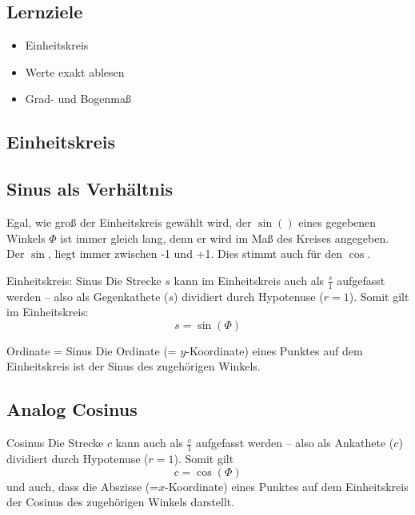 \subsection*{Lernziele}

\begin{itemize}
\item Einheitskreis
\item Werte exakt ablesen
\item Grad- und Bogenmaß
\end{itemize}

\newpage
\subsection{Einheitskreis}

\TRAINER{\einheitskreis{}}




\subsection{Sinus als Verhältnis}
Egal, wie groß der Einheitskreis gewählt wird, der $\sin()$ eines
gegebenen Winkels $\Phi$ ist immer gleich lang, denn er wird im Maß
des Kreises angegeben. Der $\sin{}$, liegt immer zwischen -1 und
+1. Dies stimmt auch für den $\cos{}$.

\begin{gesetz}{Einheitskreis: Sinus}{}
  Die Strecke $s$ kann im Einheitskreis auch als $\frac{s}1$ aufgefasst werden -- also
  als Gegenkathete ($s$) dividiert durch Hypotenuse ($r=1$). Somit
  gilt im Einheitskreis:
  $$s = \sin(\Phi)$$
\end{gesetz}

\begin{bemerkung}{Ordinate = Sinus}{}
  Die Ordinate (= $y$-Koordinate) eines Punktes auf dem Einheitskreis ist
  der Sinus des zugehörigen Winkels.
\end{bemerkung}
\newpage

\subsection{Analog Cosinus}
\begin{bemerkung}{Cosinus}{}
  Die Strecke $c$ kann auch als $\frac{c}1$ aufgefasst werden -- also
  als Ankathete ($c$) dividiert durch Hypotenuse ($r=1$). Somit
  gilt
  $$c = \cos(\Phi)$$
  und auch, dass die Abszisse (=$x$-Koordinate) eines Punktes auf dem
  Einheitskreis der Cosinus des zugehörigen Winkels darstellt.
\end{bemerkung}

